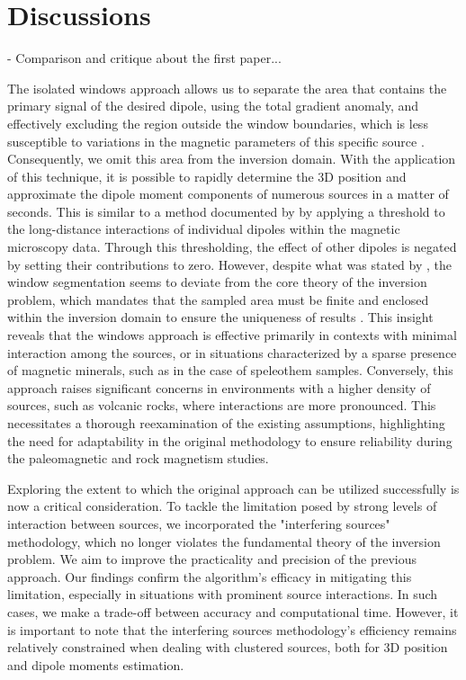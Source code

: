 \section{Discussions}

- Comparison and critique about the first paper...
 
The isolated windows approach allows us to separate the area that contains the primary signal of the desired dipole, using the total gradient anomaly, and effectively excluding the region outside the window boundaries, which is less susceptible to variations in the magnetic parameters of this specific source \citep{Souza-Junior2024}. Consequently, we omit this area from the inversion domain. With the application of this technique, it is possible to rapidly determine the 3D position and approximate the dipole moment components of numerous sources in a matter of seconds. This is similar to a method documented by \cite{Weiss2007} by applying a threshold to the long-distance interactions of individual dipoles within the magnetic microscopy data. Through this thresholding, the effect of other dipoles is negated by setting their contributions to zero. However, despite what was stated by \cite{Souza-Junior2023b}, the window segmentation seems to deviate from the core theory of the inversion problem, which mandates that the sampled area must be finite and enclosed within the inversion domain to ensure the uniqueness of results \citep{Baratchart2013, Lima2013}. This insight reveals that the windows approach is effective primarily in contexts with minimal interaction among the sources, or in situations characterized by a sparse presence of magnetic minerals, such as in the case of speleothem samples. Conversely, this approach raises significant concerns in environments with a higher density of sources, such as volcanic rocks, where interactions are more pronounced. This necessitates a thorough reexamination of the existing assumptions, highlighting the need for adaptability in the original methodology to ensure reliability during the paleomagnetic and rock magnetism studies.

Exploring the extent to which the original approach can be utilized successfully is now a critical consideration. To tackle the limitation posed by strong levels of interaction between sources, we incorporated the "interfering sources" methodology, which no longer violates the fundamental theory of the inversion problem. We aim to improve the practicality and precision of the previous approach. Our findings confirm the algorithm's efficacy in mitigating this limitation, especially in situations with prominent source interactions. In such cases, we make a trade-off between accuracy and computational time. However, it is important to note that the interfering sources methodology's efficiency remains relatively constrained when dealing with clustered sources, both for 3D position and dipole moments estimation.

